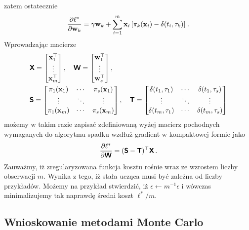 \documentclass{myclass}
\begin{document}
zatem ostatecznie
\begin{equation*}
    \pdv{\ell^*}{\mathbf{w}_k} = \gamma\mathbf{w}_k + \sum_{i=1}^m \mathbf{x}_i\left[\pi_k(\mathbf{x}_i) - \delta(t_i, \tau_k)\right]\,.
\end{equation*}
Wprowadzając macierze
\begin{equation*}
    \begin{split}
        &\oper{X} = \mqty[\mathbf{x}_1^\top \\ \vdots \\ \mathbf{x}_m^\top]\,,\quad \oper{W} = \mqty[\mathbf{w}_1^\top \\ \vdots \\ \mathbf{w}_s^\top]\,,\\
        &\oper{S} = \mqty[\pi_1(\mathbf{x}_1) & \cdots & \pi_s(\mathbf{x}_1) \\ \vdots & \ddots & \vdots \\ \pi_1(\mathbf{x}_m) & \cdots & \pi_s(\mathbf{x}_m)]\,,\quad \oper{T} = \mqty[\delta(t_1,\tau_1) & \cdots & \delta(t_1,\tau_s) \\ \vdots & \ddots & \vdots \\ \delta(t_m, \tau_1) & \cdots & \delta(t_m, \tau_s)]
    \end{split}
\end{equation*}
możemy w takim razie zapisać zdefiniowaną wyżej macierz pochodnych wymaganych do algorytmu spadku
wzdłuż gradient w kompaktowej formie jako
\begin{equation*}
    \pdv{\ell^*}{\boldsymbol{\mathsf{W}}} = (\boldsymbol{\mathsf{S}} - \boldsymbol{\mathsf{T}})^\top\boldsymbol{\mathsf{X}}\,.
\end{equation*}
Zauważmy, iż zregularyzowana funkcja kosztu rośnie wraz ze wzrostem liczby obserwacji \(m\). Wynika
z tego, iż stała ucząca musi być zależna od liczby przykładów. Możemy na przykład stwierdzić, iż
\(\epsilon \leftarrow m^{-1}\epsilon\) i wówczas minimalizujemy tak naprawdę średni koszt \(\ell^* /
m\).

\subsection{Wnioskowanie metodami Monte Carlo}
\end{document}
